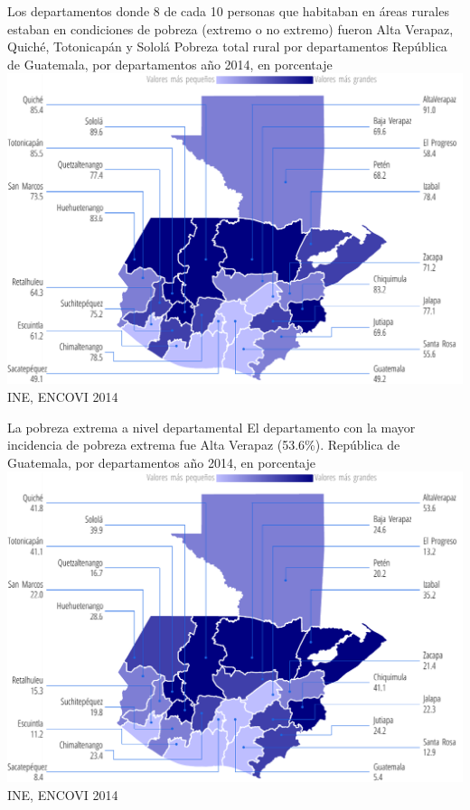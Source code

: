                     {%
                    Los departamentos donde 8 de cada 10 personas que habitaban en áreas rurales estaban en condiciones de pobreza (extremo o no extremo) fueron Alta Verapaz, Quiché, Totonicapán y Sololá}%
                    {%
                    	Pobreza total rural por departamentos
                    } %
                    {%
                    	República de Guatemala, por departamentos año 2014, en porcentaje} %
                    {%
                    	\includegraphics[width=52\cuadri]{graficas/1_17.pdf}}%
                    {%
                    	INE, ENCOVI 2014} %
                    
                    {%
                   La pobreza extrema a nivel departamental  }%
                    {%
                    El departamento con la mayor incidencia de pobreza extrema fue Alta Verapaz (53.6\%).
                    } %
                    {%
                    	República de Guatemala, por departamentos año 2014, en porcentaje} %
                    {%
                    	\includegraphics[width=52\cuadri]{graficas/1_18.pdf}}%
                    {%
                    	INE, ENCOVI 2014} %
                    
